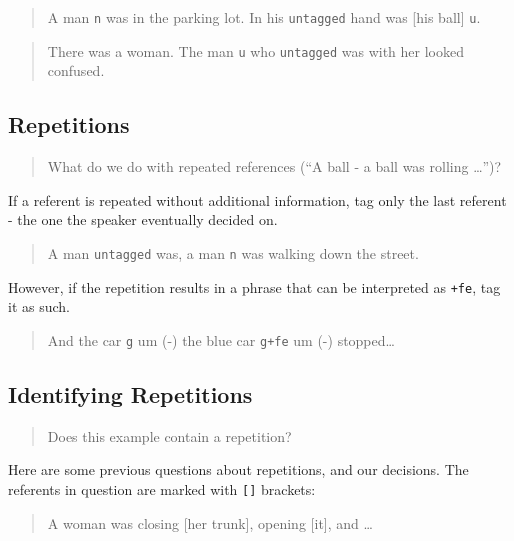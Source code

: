\documentclass[
]{book}
\begin{document}
\begin{quote}
A man \texttt{n} was in the parking lot.
In his \texttt{untagged} hand was {[}his ball{]} \texttt{u}.
\end{quote}

\begin{quote}
There was a woman.
The man \texttt{u} who \texttt{untagged} was with her looked confused.
\end{quote}

\hypertarget{repetitions}{%
\subsection{Repetitions}\label{repetitions}}

\begin{quote}
What do we do with repeated references (``A ball - a ball was rolling \ldots{}'')?
\end{quote}

If a referent is repeated without additional information,
tag only the last referent - the one the speaker eventually decided on.

\begin{quote}
A man \texttt{untagged} was, a man \texttt{n} was walking down the street.
\end{quote}

However,
if the repetition results in a phrase that can be interpreted as \texttt{+fe},
tag it as such.

\begin{quote}
And the car \texttt{g} um (-) the blue car \texttt{g+fe} um (-) stopped\ldots{}
\end{quote}

\hypertarget{identifying-repetitions}{%
\subsection{Identifying Repetitions}\label{identifying-repetitions}}

\begin{quote}
Does this example contain a repetition?
\end{quote}

Here are some previous questions about repetitions, and our decisions.
The referents in question are marked with \texttt{{[}{]}} brackets:

\begin{quote}
A woman was closing {[}her trunk{]}, opening {[}it{]}, and \ldots{}
\end{quote}
\end{document}
